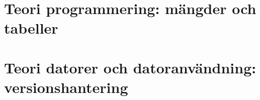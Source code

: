 


\clearpage\section{Teori programmering: mängder och tabeller}



\clearpage\section{Teori datorer och datoranvändning: versionshantering}


